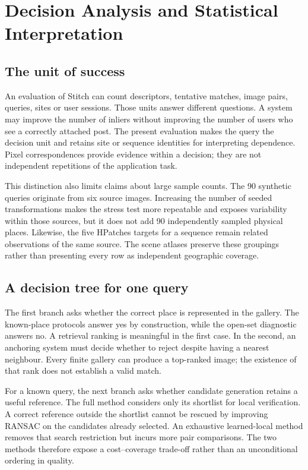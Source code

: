 \chapter{Decision Analysis and Statistical Interpretation}\label{ch:decision-analysis}
\section{The unit of success}
An evaluation of Stitch can count descriptors, tentative matches, image pairs, queries, sites or user sessions. Those units answer different questions. A system may improve the number of inliers without improving the number of users who see a correctly attached post. The present evaluation makes the query the decision unit and retains site or sequence identities for interpreting dependence. Pixel correspondences provide evidence within a decision; they are not independent repetitions of the application task.

This distinction also limits claims about large sample counts. The 90 synthetic queries originate from six source images. Increasing the number of seeded transformations makes the stress test more repeatable and exposes variability within those sources, but it does not add 90 independently sampled physical places. Likewise, the five HPatches targets for a sequence remain related observations of the same source. The scene atlases preserve these groupings rather than presenting every row as independent geographic coverage.

\section{A decision tree for one query}
The first branch asks whether the correct place is represented in the gallery. The known-place protocols answer yes by construction, while the open-set diagnostic answers no. A retrieval ranking is meaningful in the first case. In the second, an anchoring system must decide whether to reject despite having a nearest neighbour. Every finite gallery can produce a top-ranked image; the existence of that rank does not establish a valid match.

For a known query, the next branch asks whether candidate generation retains a useful reference. The full method considers only its shortlist for local verification. A correct reference outside the shortlist cannot be rescued by improving RANSAC on the candidates already selected. An exhaustive learned-local method removes that search restriction but incurs more pair comparisons. The two methods therefore expose a cost--coverage trade-off rather than an unconditional ordering in quality.


